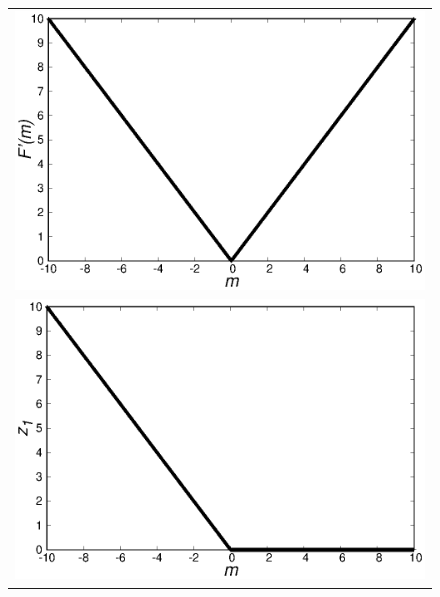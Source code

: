 \documentclass[fp,twocolumn]{jpsj3}
\begin{document}
\begin{figure}[tb]
  \begin{center}
    \begin{tabular}{c}
      \begin{minipage}{0.50\hsize}
        \centering
        \includegraphics[keepaspectratio,scale=0.33]{minimum_cost_non_t.eps}
      \end{minipage} \\
      \begin{minipage}{0.50\hsize}
        \centering
        \includegraphics[keepaspectratio,scale=0.33]{minimum_z1_non_t.eps}
      \end{minipage}
      \begin{minipage}{0.50\hsize}
        \centering

\end{minipage}
\end{tabular}
\end{center}
\end{figure}
\end{document}
